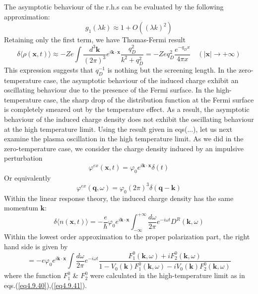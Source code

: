 The asymptotic behaviour of the r.h.s can be evaluated by the following approximation:
\begin{equation}
g_1(\lambda k)\approx 1+O((\lambda k)^2)
\end{equation}
 Retaining only the first term, we have Thomas-Fermi result
\begin{equation}
\delta\langle\rho(\mathbf x,t)\rangle\approx -Ze\int \frac{d^3\mathbf k}{(2\pi)^3}e^{i\mathbf k\cdot\mathbf x}\frac{q_D^2}{k^2+q_D^2}=-Z e q_D^2\frac{e^{-q_D x}}{4\pi x}\quad(|\mathbf x|\to+\infty)
\end{equation}
 This expression suggests that $q_D^{-1}$ is nothing but the screening length.
 In the zero-temperature case, the asymptotic behaviour of the induced charge exhibit an oscillating behaviour due to the presence of the Fermi surface.
 In the high-temperature case, the sharp drop of the distribution function at the Fermi surface is completely smeared out by the temperature effect.
 As a result, the asymptotic behaviour of the induced charge density does not exhibit the oscillating behaviour at the high temperature limit.
 Using the result given in eqs(...), let us next examine the plasma oscillation in the high temperature limit.
 As we did in the zero-temperature case, we consider the charge density induced by an impulsive perturbation
\begin{equation}
\varphi^{ex}(\mathbf x,t)=\varphi_0 e^{i\mathbf k\cdot\mathbf x}\delta(t)
\end{equation}
Or equivalently
\begin{equation}\tag{4.9.52'}
\varphi^{ex}(\mathbf q,\omega)=\varphi_0 (2\pi)^3 \delta(\mathbf q-\mathbf k)
\end{equation}
 Within the linear response theory, the induced charge density has the same momentum $\mathbf k$:
\[
\delta\langle n(\mathbf x,t)\rangle=-\frac{e}{\hbar}\varphi_0e^{i\mathbf k\cdot\mathbf x} \int_{-\infty}^{+\infty}\frac{d\omega}{2\pi}e^{-i\omega t}D^R(\mathbf k,\omega)
\]
 Within the lowest order approximation to the proper polarization part, the right hand side is given by
\begin{equation}
=-e\varphi_0 e^{i\mathbf k\cdot \mathbf x} \int \frac{d\omega}{2\pi} e^{-i\omega t} \frac{F_1^0(\mathbf k,\omega)+iF_2^0(\mathbf k,\omega)}{1-V_0(\mathbf k)F_1^0(\mathbf k,\omega)-iV_0(\mathbf k)F_2^0(\mathbf k,\omega)}
\end{equation}
where the function $F_1^0$ \& $F_2^0$ were calculated in the high-temperature limit as in eqs.(\ref{eq4.9.40}),(\ref{eq4.9.41}).
